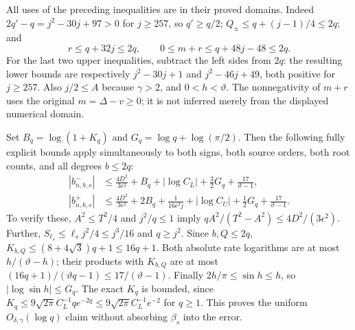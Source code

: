 \documentclass[11pt,a4paper]{article}
\begin{document}
All uses of the preceding inequalities are in their proved domains.
Indeed
$2q'-q=j^2-30j+97>0$ for $j\ge257$, so $q'\ge q/2$;
$Q_\pm\le q+(j-1)/4\le2q$; and
\[
 r\le q+32j\le2q,\qquad
 0\le m+r\le q+48j-48\le2q.
\tag{ATG24}
\]
For the last two upper inequalities, subtract the left sides from
$2q$: the resulting lower bounds are respectively
$j^2-30j+1$ and $j^2-46j+49$, both positive for $j\ge257$.
Also $j/2\le A$ because $\gamma>2$, and $0<h<\vartheta$.
The nonnegativity of $m+r$ uses the original $m=\Delta-v\ge0$;
it is not inferred merely from the displayed numerical domain.

Set $B_q=\log(1+K_q)$ and
$G_q=\log q+\log(\pi/2)$. Then the following fully explicit
bounds apply simultaneously to both signs, both source orders,
both root counts, and all degrees $b\le2q$:
\[
\begin{split}
 |b^-_{n,b,s}|&\le
 \frac{4D^2}{3\epsilon^2}+B_q+|\log C_L|
       +\tfrac32G_q+\frac{17}{\vartheta-1},\\
 |b^+_{n,b,s}|&\le
 \frac{4D^2}{3\epsilon^2}+2B_q+
       \frac1{16\epsilon^2j}+|\log C_U|
       +\tfrac12G_q+\frac{17}{\vartheta-1}.
\end{split}\tag{ATG25}
\]
To verify these, $A^2\le T^2/4$ and $j^2/q\le1$ imply
$qA^2/(T^2-A^2)\le4D^2/(3\epsilon^2)$.
Further,
$S_{\ell_s}\le\ell_s j^2/4\le j^3/16$ and $q\ge j^2$.
Since $b,Q\le2q$,
$K_{b,Q}\le(8+4\sqrt3)q+1\le16q+1$.
Both absolute rate logarithms are at most
$h/(\vartheta-h)$; their products with $K_{b,Q}$ are at most
$(16q+1)/(\vartheta q-1)\le17/(\vartheta-1)$.
Finally $2h/\pi\le\sin h\le h$, so
$|\log\sin h|\le G_q$.
The exact $K_q$ is bounded, since
$K_q\le9\sqrt{2\pi}C_L^{-1}q e^{-2q}
\le9\sqrt{2\pi}C_L^{-1}e^{-2}$ for $q\ge1$.
This proves the uniform $O_{\delta,\gamma}(\log q)$ claim without
absorbing $\beta_s$ into the error.
\end{document}
